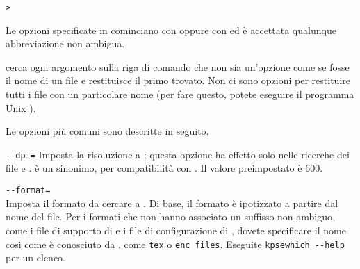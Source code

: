 \documentclass{article}
\begin{document}
\begin{alltt}
> 
\end{alltt}
Le opzioni specificate in  cominciano con \samp{-} oppure
con \samp{-{}-} ed è accettata qualunque abbreviazione non ambigua.

\KPS{} cerca ogni argomento sulla riga di comando che non sia un'opzione
come se fosse il nome di un file e restituisce il primo trovato. Non ci
sono opzioni per restituire tutti i file con un particolare nome (per fare
questo, potete eseguire il programma Unix ).

Le opzioni più comuni sono descritte in seguito.

\begin{ttdescription}
\item[\texttt{-{}-dpi=\var{num}}]\mbox{}
  Imposta la risoluzione a ; questa opzione ha effetto solo
  nelle ricerche dei file  e .  è un sinonimo,
  per compatibilità con . Il valore preimpostato è 600.

\item[\texttt{-{}-format=\var{nome}}]\mbox{}\\
  Imposta il formato da cercare a . Di base, il formato è
  ipotizzato a partire dal nome del file. Per i formati che non hanno
  associato un suffisso non ambiguo, come i file di supporto di \MP{} e i
  file di configurazione di , dovete specificare il nome
  così come è conosciuto da \KPS{}, come \texttt{tex} o \texttt{enc
  files}. Eseguite \texttt{kpsewhich -{}-help} per un elenco.


\end{ttdescription}
\end{document}
